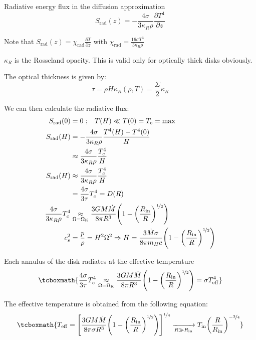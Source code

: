 \documentclass[10pt,a4paper,english]{article}
\let\originalleft\left
\let\originalright\right
\renewcommand{\left}{\mathopen{}\mathclose\bgroup\originalleft}
\renewcommand{\right}{\aftergroup\egroup\originalright}
\begin{document}
Radiative energy flux in the diffusion approximation
\begin{equation}
    S_\mathrm{rad}(z) = -\frac{4\sigma}{3\kappa_R \rho}\frac{\partial T^4}{\partial	z}
\end{equation}

Note that $\displaystyle S_\mathrm{rad}(z) = \chi_\mathrm{rad} \frac{\partial T
}{\partial z } $ with $\displaystyle\chi_\mathrm{rad} = \frac{16 \sigma
T^3}{3\kappa_R \rho}$

$\kappa_R$ is the Rosseland opacity. This is valid only for optically thick
disks obviously.

The optical thickness is given by:
\begin{equation}
    \tau = \rho H \kappa_R(\rho ,T) = \frac{\Sigma}{2} \kappa_R
\end{equation}

We can then calculate the radiative flux:
\begin{align}
    S_\mathrm{rad}(0)   & = 0 \ \mathrm{;}\quad T(H) \ll T(0) = T_c = \mathrm{max}  \\
    S_\mathrm{rad}(H) & = -\frac{4\sigma}{3\kappa_R \rho}\frac{T^4(H)-T^4(0)}{H} \\
                        & \approx \frac{4\sigma}{3\kappa_R \rho}\frac{T^4_c}{H} \\
    S_\mathrm{rad}(H) & \approx  \frac{4\sigma}{3\kappa_R \rho}\frac{T^4_c}{H}  \\
                        & = \frac{4\sigma}{3\tau}T_c^4 = D(R) \\
    \frac{4\sigma}{3\kappa_R \rho}T^4_c & \underset{\mathrm{\Omega = \Omega_K}}{\approx}
    \frac{3GM\dot{M}}{8\pi R^3}\left( 1-\left(\frac{R_\mathrm{in}}{R}\right)^{\nicefrac{1}{2}}\right) \\
    c_s^2 & = \frac{p}{\rho} = H^2\Omega^2 \Rightarrow H = \frac{3\dot{M}\sigma}{8\pi m_H c }
    \left(  1-\left(\frac{R_\mathrm{in}}{R}\right)^{\nicefrac{1}{2}} \right)
\end{align}

Each annulus of the disk radiates at the effective temperature
\begin{equation}
    \tcboxmath{
        \frac{4\sigma}{3\tau}T^4_c\underset{\mathrm{\Omega = \Omega_K}}{\approx}
        \frac{3GM\dot{M}}{8\pi R^3}\left(  1-\left(\frac{R_\mathrm{in}}{R}\right)^{\nicefrac{1}{2}}\right) =
        \sigma T_\mathrm{eff}^4
    }
\end{equation}

The effective temperature is obtained from the following equation:
\begin{equation}
    \tcboxmath{
        T_\mathrm{eff} = \left[ \frac{3GM\dot{M}}{8\pi \sigma R^3}
        \left(  1-\left(\frac{R_\mathrm{in}}{R}\right)^{\nicefrac{1}{2}}\right)\right]^{\nicefrac{1}{4}}
        \xrightarrow[R \gg R_\mathrm{in}]{}  T_\mathrm{in}\left(\frac{R}{R_\mathrm{in}}\right)^{-\nicefrac{3}{4}}
    }
\end{equation}
\end{document}
